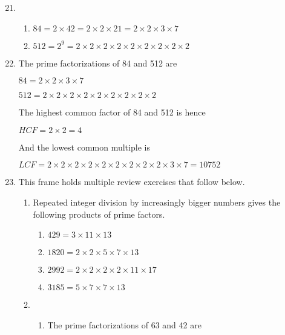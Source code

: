 \documentclass[fleqn]{article}
\begin{document}
\begin{enumerate}[label=\textbf{\arabic*.},labelsep=2em]
\setcounter{enumi}{20}
\item
\begin{enumerate}[label=\textbf{(\alph*)},labelsep=2em]
\item $ 84 = 2 \times 42 = 2 \times 2 \times 21 = 2 \times 2 \times 3 \times 7 $
\item $ 512 = 2^9 = 2 \times 2 \times 2 \times 2 \times 2 \times 2 \times 2 \times 2 \times 2 $ \\
\end{enumerate}

\setcounter{enumi}{22}
\item
The prime factorizations of 84 and 512 are

$84 = 2 \times 2 \times 3 \times 7$

$ 512 = 2 \times 2 \times 2 \times 2 \times 2 \times 2 \times 2 \times 2 \times 2 $

The highest common factor of 84 and 512 is hence

$ HCF = 2 \times 2 = 4 $

And the lowest common multiple is

$ LCF = 2 \times 2 \times 2 \times 2 \times 2 \times 2 \times 2 \times 2 \times 2 \times 3 \times 7 
= 10752 $

\setcounter{enumi}{25}
\item This frame holds multiple review exercises that follow below.

\begin{enumerate}[label=\textbf{\arabic*.},labelsep=2em]
\item
Repeated integer division by increasingly bigger numbers gives the following products of prime factors. 

\begin{enumerate}[label=\textbf{(\alph*)},labelsep=2em]
\item $ 429 = 3 \times 11 \times 13 $
\item $ 1820 = 2 \times 2 \times 5 \times 7 \times 13 $
\item $ 2992 = 2 \times 2 \times 2 \times 2 \times 11 \times 17 $
\item $ 3185 = 5 \times 7 \times 7 \times 13 $
\end{enumerate}

\item

\begin{enumerate}[label=\textbf{(\alph*)},labelsep=2em]
\item
The prime factorizations of 63 and 42 are


\end{enumerate}
\end{enumerate}
\end{enumerate}
\end{document}

